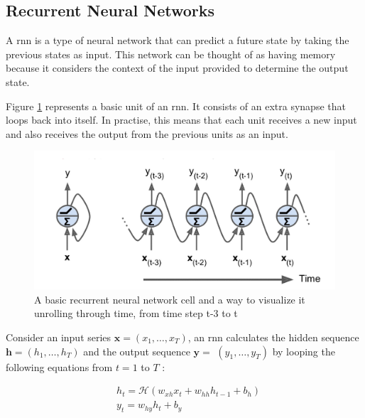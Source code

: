 \subsection {Recurrent Neural Networks}
A \acrfull{rnn} is a type of neural network that can predict a future state by taking the previous states as input. \cite{Graves2013SpeechNetworks} This network can be thought of as having memory because it considers the context of the input provided to determine the output state. \cite{Hagner2017RecurrentModel}

Figure \ref{fig:rnn} represents a basic unit of an \acrshort{rnn}. It consists of an extra synapse that loops back into itself. In practise, this means that each unit receives a new input and also receives the output from the previous units as an input.
\begin{figure}[ht]
  \begin{center}
    \includegraphics[width=\textwidth]{images/rnn.png} 
    \caption{A basic recurrent neural network cell and a way to visualize it
unrolling through time, from time step t-3 to t \cite{Hagner2017RecurrentModel}}
    \label{fig:rnn}
  \end{center}
\end{figure}

Consider an input series $\boldsymbol{x}=\left(x_{1}, \ldots, x_{T}\right)$, an \acrshort{rnn} calculates the hidden sequence $\boldsymbol{h}=\left(h_{1}, \ldots, h_{T}\right)$ and the output sequence $\boldsymbol{y}=$ $\left(y_{1}, \ldots, y_{T}\right)$ by looping the following equations from $t=1$ to $T$ :

$$
\begin{aligned}
&h_{t}=\mathcal{H}\left(w_{xh} x_{t}+w_{hh} h_{t-1}+b_{h}\right) \\
&y_{t}=w_{h y} h_{t}+b_{y}
\end{aligned}
$$

